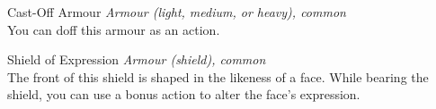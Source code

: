 \begingroup
	\DndSetThemeColor[PhbLightGreen]
	\begin{DndComment}{Cast-Off Armour}
		\textit{Armour (light, medium, or heavy), common}\\
		You can doff this armour as an action.
	\end{DndComment}
	\begin{DndComment}{Shield of Expression}
		\textit{Armour (shield), common}\\
		The front of this shield is shaped in the likeness of a face. While bearing the shield, you can use a bonus action to alter the face's expression.
	\end{DndComment}
\endgroup




